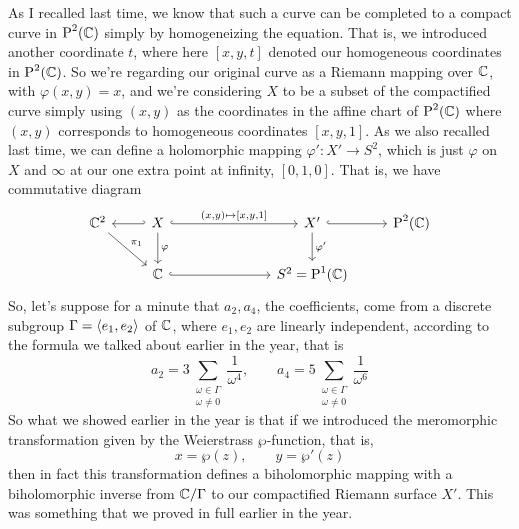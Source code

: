 \documentclass{article}
\begin{document}
As I recalled last time, we know that such a curve can be completed to a compact curve in \(\operatorname{P}^{2}({\mathbb{C}})\) simply by homogeneizing the equation. That is, we introduced another coordinate \(t\), where here \([x, y, t]\) denoted our homogeneous coordinates in \(\operatorname{P}^{2}({\mathbb{C}})\). So we're regarding our original curve as a Riemann mapping over \(\mathbb{C}\), with \(\varphi(x, y) = x\), and we're considering \(X\) to be a subset of the compactified curve simply using \((x, y)\) as the coordinates in the affine chart of \(\operatorname{P}^{2}({\mathbb{C}})\) where \((x, y)\) corresponds to homogeneous coordinates \([x, y, 1]\). As we also recalled last time, we can define a holomorphic mapping \(\varphi': X' \to S^2\), which is just \(\varphi\) on \(X\) and \(\infty\) at our one extra point at infinity, \([0, 1, 0]\). That is, we have commutative diagram
\begin{equation}
\begin{tikzcd}
  \mbb{C}^2 \arrow[hookleftarrow, r] \arrow[rd, "\pi_1"]
    & X \arrow[hookrightarrow, rrr, "{(x, y) \mapsto [x, y, 1]}"] \arrow[d, "\varphi"]
    &&& X' \arrow[hookrightarrow, r] \arrow[d, "\varphi'"]
    & \CP{2}
    \\
  & \mbb{C} \arrow[hookrightarrow, rrr] &&& S^2 = \CP{1}
\end{tikzcd}
\end{equation}
So, let's suppose for a minute that \(a_2, a_4\), the coefficients, come from a discrete subgroup \(\Gamma = \left\langle e_1, e_2\right\rangle\) of \(\mathbb{C}\), where \(e_1, e_2\) are linearly independent, according to the formula we talked about earlier in the year, that is
\begin{equation}
a_2 = 3\sum_{\substack{\omega \in \Gamma \\ \omega \neq 0}}\frac{1}{\omega^4}, \qquad a_4 = 5\sum_{\substack{\omega \in \Gamma \\ \omega \neq 0}}\frac{1}{\omega^6}
\end{equation}
So what we showed earlier in the year is that if we introduced the meromorphic transformation given by the Weierstrass \(\wp\)-function, that is,
\begin{equation}
  x = \wp(z), \qquad y = \wp'(z)
  \label{equation:meromorphic_weierstrass}
\end{equation}
then in fact this transformation defines a biholomorphic mapping with a biholomorphic inverse from \(\mathbb{C}/\Gamma\) to our compactified Riemann surface \(X'\). This was something that we proved in full earlier in the year.
\end{document}
